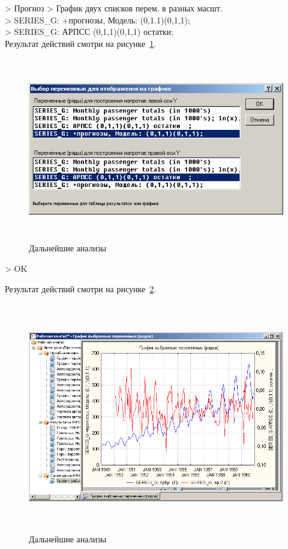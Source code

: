\newpage

> Прогноз > График двух списков перем. в разных масшт.\\
> SERIES\_G: +прогнозы, Модель: (0,1.1)(0,1,1);\\
> SERIES\_G: АРПСС (0,1,1)(0,1,1) остатки;\\

Результат действий смотри на рисунке~\ref{fig:22}.

\begin{figure}[!h]
  \centering

  \includegraphics[height=8cm]
  {inc/22.PNG}

  \caption{Дальнейшие анализы}

  \label{fig:22}
\end{figure}

> OK

Результат действий смотри на рисунке~\ref{fig:23}.

\begin{figure}[!h]
  \centering

  \includegraphics[height=10cm]
  {inc/23.PNG}

  \caption{Дальнейшие анализы}

  \label{fig:23}
\end{figure}
